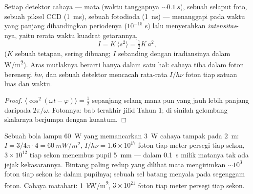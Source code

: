 \begin{proposition}\label{prop:b2:scalar-light-model:intensity}
Setiap detektor cahaya --- mata (waktu tanggapnya $\sim\qty{0.1}{s}$), sebuah
selaput foto, sebuah piksel CCD (\qty{1}{ms}), sebuah fotodioda (\qty{1}{ns}) ---
menanggapi pada waktu yang panjang dibandingkan periodenya ($10^{-15}$ s) lalu
menyerahkan \emph{intensitas}-nya, yaitu rerata waktu kuadrat
getarannya,
\[
I = K\,\langle s^2\rangle = \tfrac12K\,a^2 ,
\]
($K$ sebuah tetapan, sering dibuang; $I$ sebanding dengan iradiansinya
dalam \unit{W/m^2}). Aras mutlaknya berarti hanya dalam satu hal: cahaya
tiba dalam foton berenergi $h\nu$, dan sebuah detektor mencacah rata-rata
$I/h\nu$ foton tiap satuan luas dan waktu.
\end{proposition}

\begin{proof}
$\langle\cos^2(\omega t - \varphi)\rangle = \tfrac12$ sepanjang selang mana pun yang jauh lebih panjang
daripada $2\pi/\omega$. Fotonnya: bab terakhir jilid Tahun 1; di sinilah
gelombang skalarnya berjumpa dengan kuantum.
\end{proof}

\begin{example}\label{ex:b2:scalar-light-model:orders}
Sebuah bola lampu \qty{60}{W} yang memancarkan \qty{3}{W} cahaya tampak pada \qty{2}{m}:
$I = 3/4\pi\cdot4 = \qty{60}{mW/m^2}$, $I/h\nu = 1.6 \times 10^{17}$ foton tiap meter
persegi tiap sekon, $3 \times 10^{12}$ tiap sekon menembus pupil \qty{5}{mm} ---
dalam \qty{0.1}{s} milik matanya tak ada jejak kekasarannya. Bintang
paling redup yang dilihat mata mengirimkan $\sim 10^3$ foton tiap sekon ke dalam
pupilnya; sebuah sel batang menyala pada segenggam foton. Cahaya matahari: \qty{1}{kW/m^2}, $3 \times 10^{21}$
foton tiap meter persegi tiap sekon.
\end{example}

